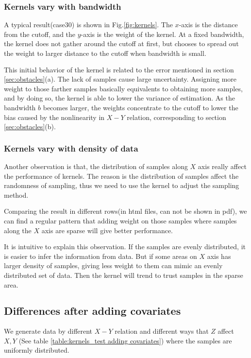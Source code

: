\documentclass[a4 paper,12pt]{article}
\begin{document}
\subsubsection*{Kernels vary with bandwidth}

A typical result(case30) is shown in Fig.\ref{fig:kernels}. The $x$-axis is the distance from the cutoff, and the $y$-axis is the weight of the kernel. At a fixed bandwidth, the kernel does not gather around the cutoff at first, but chooses to spread out the weight to larger distance to the cutoff when bandwidth is small.

This initial behavior of the kernel is related to the error mentioned in section \ref{sec:obstacles}(a). The lack of samples cause large uncertainty. Assigning more weight to those farther samples basically equivalents to obtaining more samples, and by doing so, the kernel is able to lower the variance of estimation. As the bandwidth $b$ becomes larger, the weights concentrate to the cutoff to lower the bias caused by the nonlinearity in $X-Y$ relation, corresponding to section \ref{sec:obstacles}(b).

\subsubsection*{Kernels vary with density of data}

Another observation is that, the distribution of samples along $X$ axis really affect the performance of kernels. The reason is the distribution of samples affect the randomness of sampling, thus we need to use the kernel to adjust the sampling method.

Comparing the result in different rows(in html files, can not be shown in pdf), we can find a regular pattern that adding weight on those samples where samples along the $X$ axis are sparse will give better performance. 

It is intuitive to explain this observation. If the samples are evenly distributed, it is easier to infer the information from data. But if some areas on $X$ axis has larger density of samples, giving less weight to them can mimic an evenly distributed set of data. Then the kernel will trend to trust samples in the sparse area.

\subsection{Differences after adding covariates}
We generate data by different $X-Y$ relation and different ways that $Z$ affect $X,Y$ (See table \ref{table:kernels_test adding covariates}) where the samples are uniformly distributed.
\end{document}
